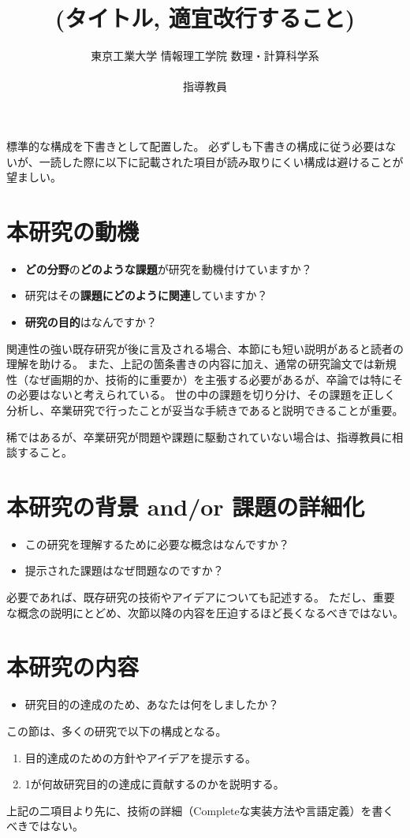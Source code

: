 \documentclass[11pt, a4paper, oneside, twocolumn]{jsarticle}
\title{%
(タイトル, 適宜改行すること)
}
\author{%
東京工業大学 情報理工学院 数理・計算科学系\\
\studentID \ 
\authorname \\
指導教員 \supervisor
}
\date{}
\begin{document}
\maketitle




標準的な構成を下書きとして配置した。
必ずしも下書きの構成に従う必要はないが、一読した際に以下に記載された項目が読み取りにくい構成は避けることが望ましい。

\section{本研究の動機}
\begin{itemize}
\item \textbf{どの分野}の\textbf{どのような課題}が研究を動機付けていますか？
\item 研究はその\textbf{課題にどのように関連}していますか？
\item \textbf{研究の目的}はなんですか？
\end{itemize}
関連性の強い既存研究が後に言及される場合、本節にも短い説明があると読者の理解を助ける。
また、上記の箇条書きの内容に加え、通常の研究論文では新規性（なぜ画期的か、技術的に重要か）を主張する必要があるが、卒論では特にその必要はないと考えられている。
世の中の課題を切り分け、その課題を正しく分析し、卒業研究で行ったことが妥当な手続きであると説明できることが重要。

稀ではあるが、卒業研究が問題や課題に駆動されていない場合は、指導教員に相談すること。

\section{本研究の背景 and/or 課題の詳細化}
\begin{itemize}
\item この研究を理解するために必要な概念はなんですか？
\item 提示された課題はなぜ問題なのですか？
\end{itemize}
必要であれば、既存研究の技術やアイデアについても記述する。
ただし、重要な概念の説明にとどめ、次節以降の内容を圧迫するほど長くなるべきではない。

\section{本研究の内容}
\begin{itemize}
\item 研究目的の達成のため、あなたは何をしましたか？
\end{itemize}
この節は、多くの研究で以下の構成となる。
\begin{enumerate}
\item 目的達成のための方針やアイデアを提示する。
\item 1が何故研究目的の達成に貢献するのかを説明する。
\end{enumerate}
上記の二項目より先に、技術の詳細（Completeな実装方法や言語定義）を書くべきではない。
\end{document}
